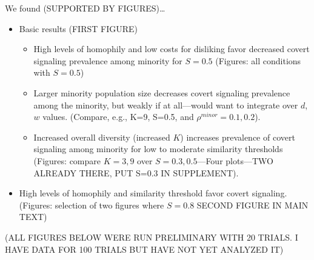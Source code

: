 \documentclass[11pt,letterpaper]{article}
\begin{document}
We found (SUPPORTED BY FIGURES)\dots
\begin{itemize}
    \item Basic results (FIRST FIGURE)
        \begin{itemize}
          \item High levels of homophily and low costs for disliking favor 
              decreased covert signaling prevalence among minority for 
              $S=0.5$ (Figures: all conditions
              with $S=0.5$)
          \item Larger minority population size decreases covert 
              signaling prevalence among the minority,
            but weakly if at all---would want to integrate over $d$, $w$ values.
            (Compare, e.g., K=9, S=0.5, and $\rho^{minor}=0.1,0.2$).
          \item Increased overall diversity (increased $K$) increases prevalence of 
            covert signaling among minority for low to moderate 
            similarity thresholds (Figures: compare $K=3,9$ over 
            $S=0.3, 0.5$---Four plots---TWO ALREADY THERE,
            PUT S=0.3 IN SUPPLEMENT).
        \end{itemize}
  \item High levels of homophily and similarity threshold favor covert signaling.
    (Figures: selection of two figures where $S=0.8$ SECOND FIGURE IN MAIN TEXT)
\end{itemize}

(ALL FIGURES BELOW WERE RUN PRELIMINARY WITH 20 TRIALS. I HAVE DATA FOR 100
TRIALS BUT HAVE NOT YET ANALYZED IT)
\end{document}
